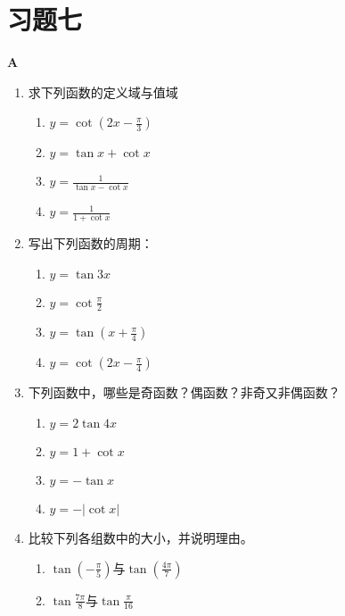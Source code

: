 \section*{习题七}
\begin{center}
    \bfseries A
\end{center}
\begin{enumerate}
    \item 求下列函数的定义域与值域
\begin{multicols}{2}
\begin{enumerate}[(1)]
    \item  $y= \cot\left ( 2x- \frac \pi 3\right )$
    \item $y= \tan x+ \cot x$
    \item $y= \frac 1{\tan x- \cot x}$
    \item $y= \frac 1{1+ \cot x}$
\end{enumerate}
\end{multicols}
    \item 写出下列函数的周期：
\begin{multicols}{2}
\begin{enumerate}[(1)]
    \item $y=\tan 3x$
    \item $y=\cot \frac{\pi}{2}$
    \item $y=\tan\left(x+\frac{\pi}{4}\right)$
    \item $y=\cot\left(2x-\frac{\pi}{4}\right)$
\end{enumerate}
\end{multicols}
  
    \item 下列函数中，哪些是奇函数？偶函数？非奇又非偶函数？
\begin{multicols}{2}
\begin{enumerate}[(1)]
    \item $y=2\tan 4x$
    \item $y= 1+\cot x$ 
    \item $y=-\tan x$
    \item $y= - |\cot x|$
\end{enumerate}
\end{multicols}
    \item 比较下列各组数中的大小，并说明理由。
\begin{multicols}{2}
\begin{enumerate}[(1)]
    \item $\tan \left(-\frac\pi5\right)$与$\tan\left(\frac{4\pi}{7}\right)$
    \item $\tan \frac{7\pi}8$与$\tan\frac\pi{16}$
\end{enumerate}\end{multicols}
\end{enumerate}

